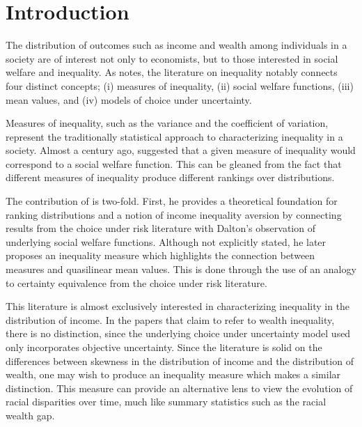 \documentclass[Chp3.tex]{subfiles}
\begin{document}
\hypertarget{Introduction}{}
\section{Introduction}\label{sec:intro}


\par The distribution of outcomes such as income and wealth among individuals in a society are of interest not only to economists, but to those interested in social welfare and inequality. As \cite{ch83} notes, the literature on inequality notably connects four distinct concepts; (i) measures of inequality, (ii) social welfare functions, (iii) mean values, and (iv) models of choice under uncertainty.

\par Measures of inequality, such as the variance and the coefficient of variation, represent the traditionally statistical approach to characterizing inequality in a society. Almost a century ago, \cite{hd20} suggested that a given measure of inequality would correspond to a social welfare function. This can be gleaned from the fact that different measures of inequality produce different rankings over distributions.

\par The contribution of \cite{aa70} is two-fold. First, he provides a theoretical foundation for ranking distributions and a notion of income inequality aversion by connecting results from the choice under risk literature with Dalton's observation of underlying social welfare functions. Although not explicitly stated, he later proposes an inequality measure which highlights the connection between measures and quasilinear mean values. This is done through the use of an analogy to certainty equivalence from the choice under risk literature.

\par This literature is almost exclusively interested in characterizing inequality in the distribution of income. In the papers that claim to refer to wealth inequality, there is no  distinction, since the underlying choice under uncertainty model used only incorporates objective uncertainty. Since the literature is solid on the differences between skewness in the distribution of income and the distribution of wealth, one may wish to produce an inequality measure which makes a similar distinction. This measure can provide an alternative lens to view the evolution of racial disparities over time, much like summary statistics such as the racial wealth gap.  
\end{document}
